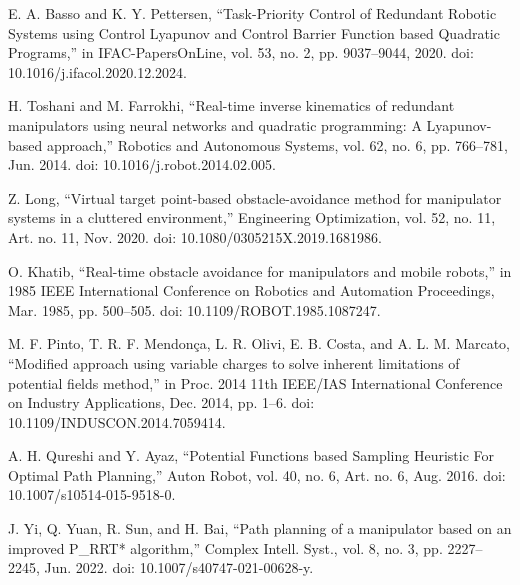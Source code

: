 \documentclass[letterpaper, 10 pt, conference]{ieeeconf}  %
\begin{document}
\begin{thebibliography}{99}
 E. A. Basso and K. Y. Pettersen, “Task-Priority Control of Redundant Robotic Systems using Control Lyapunov and Control Barrier Function based Quadratic Programs,” in IFAC-PapersOnLine, vol. 53, no. 2, pp. 9037–9044, 2020. doi: 10.1016/j.ifacol.2020.12.2024.

 H. Toshani and M. Farrokhi, “Real-time inverse kinematics of redundant manipulators using neural networks and quadratic programming: A Lyapunov-based approach,” Robotics and Autonomous Systems, vol. 62, no. 6, pp. 766–781, Jun. 2014. doi: 10.1016/j.robot.2014.02.005.


 Z. Long, “Virtual target point-based obstacle-avoidance method for manipulator systems in a cluttered environment,” Engineering Optimization, vol. 52, no. 11, Art. no. 11, Nov. 2020. doi: 10.1080/0305215X.2019.1681986.

 O. Khatib, “Real-time obstacle avoidance for manipulators and mobile robots,” in 1985 IEEE International Conference on Robotics and Automation Proceedings, Mar. 1985, pp. 500–505. doi: 10.1109/ROBOT.1985.1087247.


 M. F. Pinto, T. R. F. Mendonça, L. R. Olivi, E. B. Costa, and A. L. M. Marcato, “Modified approach using variable charges to solve inherent limitations of potential fields method,” in Proc. 2014 11th IEEE/IAS International Conference on Industry Applications, Dec. 2014, pp. 1–6. doi: 10.1109/INDUSCON.2014.7059414.

 A. H. Qureshi and Y. Ayaz, “Potential Functions based Sampling Heuristic For Optimal Path Planning,” Auton Robot, vol. 40, no. 6, Art. no. 6, Aug. 2016. doi: 10.1007/s10514-015-9518-0.


 J. Yi, Q. Yuan, R. Sun, and H. Bai, “Path planning of a manipulator based on an improved P\_RRT* algorithm,” Complex Intell. Syst., vol. 8, no. 3, pp. 2227–2245, Jun. 2022. doi: 10.1007/s40747-021-00628-y.


\end{thebibliography}
\end{document}
